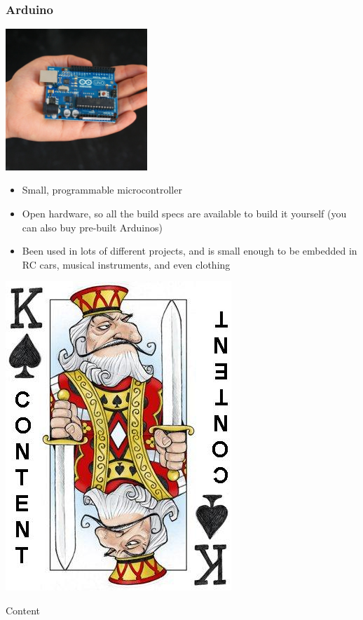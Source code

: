 \documentclass{beamer}
\begin{document}

\begin{frame}
  \frametitle{Arduino}
  \begin{center} \includegraphics[width=0.4\textwidth]{../img/arduino} \end{center}
  \begin{itemize}
  \item Small, programmable \textcolor{beamer@myblue}{microcontroller}
  \item Open hardware, so all the build specs are available to build
    it yourself (you can also buy pre-built Arduinos)
  \item Been used in lots of different projects, and is small enough to be embedded in RC cars, musical instruments, and even clothing
  \end{itemize}
\end{frame}


\begin{frame}
  \begin{center} 
    \includegraphics[height=0.7\textheight]{../img/content-king}

    \begin{Huge} Content \end{Huge} 
  \end{center}
\end{frame}
\end{document}

